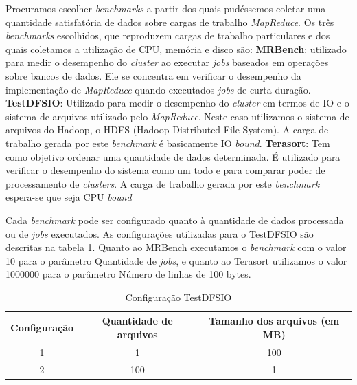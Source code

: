 \documentclass[a4paper,10pt]{article}
\begin{document}
Procuramos escolher \textit{benchmarks} a partir dos quais pudéssemos coletar
uma quantidade satisfatória de dados sobre cargas de trabalho
\textit{MapReduce}. Os três \textit{benchmarks} escolhidos, que reproduzem
cargas de trabalho particulares e dos quais coletamos a utilização de CPU,
memória e disco são:
\newline \newline
\textbf{MRBench\cite{benchmarks}\cite{Kim:2008:MBM:1491261.1491574}}: utilizado
para medir o desempenho do \textit{cluster} ao executar \textit{jobs} baseados 
em operações sobre bancos de dados. Ele se concentra em verificar o
desempenho da implementação de \textit{MapReduce} quando executados
\textit{jobs} de curta duração.\newline
\textbf{TestDFSIO\cite{benchmarks}}: Utilizado para medir o desempenho do
\textit{cluster} em termos de IO e o sistema de arquivos utilizado pelo
\textit{MapReduce}. Neste caso utilizamos o sistema de arquivos do Hadoop, o
HDFS (Hadoop Distributed File System). A carga de trabalho gerada por
este \textit{benchmark} é basicamente IO \textit{bound}.\newline
\textbf{Terasort\cite{benchmarks}}: Tem como objetivo ordenar uma quantidade de
dados determinada. É utilizado para verificar o desempenho do sistema como um
todo e para comparar poder de processamento de \textit{clusters}. A
carga de trabalho gerada por este \textit{benchmark}
espera-se que seja CPU \textit{bound}\newline

Cada \textit{benchmark} pode ser configurado quanto à quantidade de dados
processada ou de \textit{jobs} executados. As configurações utilizadas para o
TestDFSIO são descritas na tabela \ref{configuration_testdfsio}. Quanto ao
MRBench executamos o \textit{benchmark} com o valor 10 para o parâmetro
Quantidade de \textit{jobs}, e quanto ao Terasort utilizamos o valor 1000000
para o parâmetro Número de linhas de 100 bytes.

\begin{table}[htp]
  \centering
  \caption{Configuração TestDFSIO}
  \label{configuration_testdfsio}
  \begin{tabular}{|c|c|c|}
      \hline
      Configuração & Quantidade de arquivos & Tamanho dos arquivos (em MB) \\
      \hline
      \hline
      1 & 1 & 100 \\
      \hline
      2 & 100 & 1 \\
      \hline
  \end{tabular}
\end{table}
\end{document}
